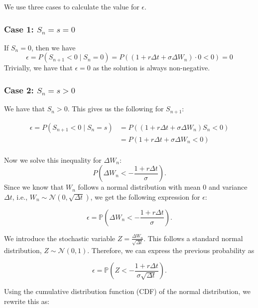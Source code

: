\documentclass[a4paper,12pt]{article} %
\begin{document}
We use three cases to calculate the value for $\epsilon$.

\subsubsection{Case 1: $S_n = s = 0$}
If $S_n = 0$, then we have
\begin{equation}
    \epsilon = P(S_{n+1} < 0 \mid S_n = 0) = P((1 + r \Delta t + \sigma \Delta W_n) \cdot 0 < 0) = 0
\end{equation}
Trivially, we have that $\epsilon = 0$ as the solution is always non-negative.

\subsubsection{Case 2: $S_n = s > 0$}
We have that $S_n > 0$. This gives us the following for $S_{n+1}$:

\begin{align}
    \epsilon  = P(S_{n+1} < 0 \mid S_n = s) & = P((1 + r \Delta t + \sigma \Delta W_n) S_n < 0) \\
                                            & = P(1 + r \Delta t + \sigma \Delta W_n < 0)       \\
\end{align}

Now we solve this inequality for $\Delta W_n$:
\begin{equation}
    P\left(  \Delta W_n < -\frac{1 + r \Delta t}{\sigma} \right).
\end{equation}
Since we know that $W_n$ follows a normal distribution with mean $0$ and variance $\Delta t$, i.e., $W_{n} \sim \mathcal{N}(0, \sqrt{\Delta t})$, we get the following expression for $\epsilon$:

\begin{equation}
    \epsilon = \mathbb{P}\left(\Delta W_n < -\frac{1 + r \Delta t}{\sigma}\right).
\end{equation}

We introduce the stochastic variable $Z = \frac{\Delta W_n}{\sqrt{\Delta t}}$. This follows a standard normal distribution, $Z \sim \mathcal{N}(0, 1)$. Therefore, we can express the previous probability as

\begin{equation}
    \epsilon = \mathbb{P}\left(Z < - \frac{1 + r \Delta t}{\sigma \sqrt{\Delta t}}\right).
\end{equation}

Using the cumulative distribution function (CDF) of the normal distribution, we rewrite this as:
\end{document}
